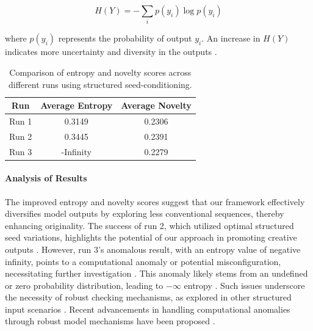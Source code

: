 \documentclass{article} %
\begin{document}
\begin{equation}
H(Y) = - \sum_{i} p(y_i) \log p(y_i)
\end{equation}


where $p(y_i)$ represents the probability of output $y_i$. An increase in $H(Y)$ indicates more uncertainty and diversity in the outputs \citep{maximum2010}.





\begin{table}[h]
\centering
\begin{tabular}{ccc}
\hline
\textbf{Run} & \textbf{Average Entropy} & \textbf{Average Novelty} \\ 
\hline
Run 1 & 0.3149 & 0.2306 \\
Run 2 & 0.3445 & 0.2391 \\
Run 3 & -Infinity & 0.2279 \\
\hline
\end{tabular}
\caption{Comparison of entropy and novelty scores across different runs using structured seed-conditioning.}
\label{tab:results}
\end{table}


\paragraph{Analysis of Results} The improved entropy and novelty scores suggest that our framework effectively diversifies model outputs by exploring less conventional sequences, thereby enhancing originality. The success of run 2, which utilized optimal structured seed variations, highlights the potential of our approach in promoting creative outputs \citep{measuring2025,generative2024}. However, run 3's anomalous result, with an entropy value of negative infinity, points to a computational anomaly or potential misconfiguration, necessitating further investigation \citep{large2024}. This anomaly likely stems from an undefined or zero probability distribution, leading to $-\infty$ entropy \citep{creating2012}. Such issues underscore the necessity of robust checking mechanisms, as explored in other structured input scenarios \citep{cottontail2025}. Recent advancements in handling computational anomalies through robust model mechanisms have been proposed \citep{investigating2025}.
\end{document}
